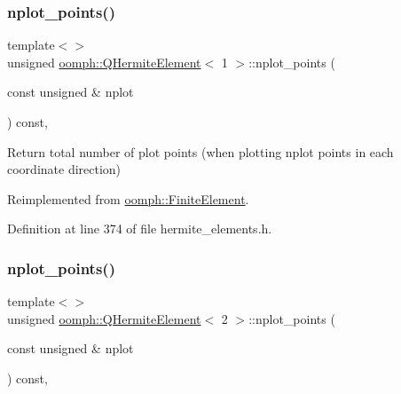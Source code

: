 \mbox{\label{classoomph_1_1QHermiteElement_a97a492c5be028112ec449d5a973a4fe7}} 
\subsubsection{\texorpdfstring{nplot\+\_\+points()}{nplot\_points()}\hspace{0.1cm}{\footnotesize\ttfamily [2/3]}}
{\footnotesize\ttfamily template$<$$>$ \\
unsigned \hyperlink{classoomph_1_1QHermiteElement}{oomph\+::\+Q\+Hermite\+Element}$<$ 1 $>$\+::nplot\+\_\+points (\begin{DoxyParamCaption}\item[{const unsigned \&}]{nplot }\end{DoxyParamCaption}) const\hspace{0.3cm}{\ttfamily [inline]}, {\ttfamily [virtual]}}

Return total number of plot points (when plotting nplot points in each coordinate direction) 

Reimplemented from \hyperlink{classoomph_1_1FiniteElement_a8ed563c7ff0cfd8bafdbb0132b388106}{oomph\+::\+Finite\+Element}.



Definition at line 374 of file hermite\+\_\+elements.\+h.

\mbox{\label{classoomph_1_1QHermiteElement_a3c5d93116e819f41baf0f90c03e13bbd}} 
\subsubsection{\texorpdfstring{nplot\+\_\+points()}{nplot\_points()}\hspace{0.1cm}{\footnotesize\ttfamily [3/3]}}
{\footnotesize\ttfamily template$<$$>$ \\
unsigned \hyperlink{classoomph_1_1QHermiteElement}{oomph\+::\+Q\+Hermite\+Element}$<$ 2 $>$\+::nplot\+\_\+points (\begin{DoxyParamCaption}\item[{const unsigned \&}]{nplot }\end{DoxyParamCaption}) const\hspace{0.3cm}{\ttfamily [inline]}, {\ttfamily [virtual]}}


